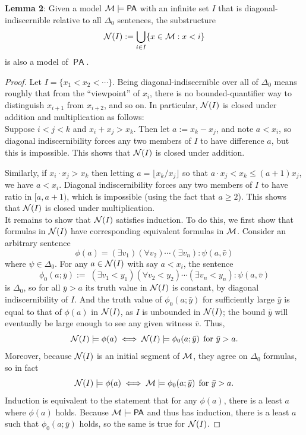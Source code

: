 \documentclass{amsart}
\DeclareMathOperator{\PA}{\mathsf{PA}}
\begin{document}
	\noindent \textbf{Lemma 2}: Given a model $\M\models \PA$ with an infinite set $I$ that is diagonal-indiscernible relative to all $\Delta_0$ sentences, the substructure
	$$
	\mathcal{N}(I) := \bigcup_{i\in I} \{x\in \mathcal{M} : x<i\}
	$$
	is also a model of $\PA$.
	\begin{proof}
		Let $I=\{x_1<x_2<\cdots\}$. Being diagonal-indiscernible over all of $\Delta_0$ means roughly that from the ``viewpoint'' of $x_i$, there is no bounded-quantifier way to distinguish $x_{i+1}$ from $x_{i+2}$, and so on. In particular, $\mathcal{N}(I)$ is closed under addition and multiplication as follows:\\
		
		Suppose $i<j<k$ and $x_i+x_j>x_k$. Then let $a:=x_k-x_j$, and note $a<x_i$, so diagonal indiscernibility forces any two members of $I$ to have difference $a$, but this is impossible. This shows that $\mathcal{N}(I)$ is closed under addition.
		
		Similarly, if $x_i\cdot x_j > x_k$ then letting $a=\lfloor x_k/x_j\rfloor$ so that $a\cdot x_j < x_k \leq (a+1)x_j$, we have $a<x_i$. Diagonal indiscernibility forces any two members of $I$ to have ratio in $[a,a+1)$, which is impossible (using the fact that $a\geq 2$). This shows that $\mathcal{N}(I)$ is closed under multiplication.\\
		
		It remains to show that $\mathcal{N}(I)$ satisfies induction. To do this, we first show that formulas in $\mathcal{N}(I)$ have corresponding equivalent formulas in $\mathcal{M}$. Consider an arbitrary sentence 
		$$\phi(a) = (\exists v_1)(\forall v_2) \cdots (\exists v_n): \psi(a,\bar{v})$$
		where $\psi\in \Delta_0$. For any $a\in \mathcal{N}(I)$ with say $a<x_i$, the sentence
		$$
		\phi_0(a;\bar{y}):= \; (\exists v_1 < y_1)(\forall v_2 < y_2)\cdots (\exists v_n<y_n): \psi(a,\bar{v})
		$$
		is $\Delta_0$, so for all $\bar{y}>a$ its truth value in $\mathcal{N}(I)$ is constant, by diagonal indiscernibility of $I$. And the truth value of $\phi_0(a;\bar{y})$ for sufficiently large $\bar{y}$ is equal to that of $\phi(a)$ in $\mathcal{N}(I)$, as $I$ is unbounded in $\mathcal{N}(I)$; the bound $\bar{y}$ will eventually be large enough to see any given witness $\bar{v}$. Thus, 
		$$
		\mathcal{N}(I)\models \phi(a) \iff \mathcal{N}(I) \models \phi_0(a;\bar{y}) \;\, \text{for }\bar{y}>a.
		$$ Moreover, because $\mathcal{N}(I)$ is an initial segment of $\mathcal{M}$, they agree on $\Delta_0$ formulas, so in fact
		$$
		\mathcal{N}(I)\models \phi(a) \iff \mathcal{M} \models \phi_0(a;\bar{y}) \;\, \text{for }\bar{y}>a.
		$$
		Induction is equivalent to the statement that for any $\phi(a)$, there is a least $a$ where $\phi(a)$ holds. Because $\MM\models \PA$ and thus has induction, there is a least $a$ such that $\phi_0(a;\bar{y})$ holds, so the same is true for $\mathcal{N}(I)$.
	\end{proof}
	
\end{document}

